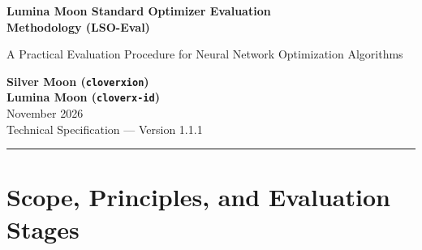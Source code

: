 \documentclass[11pt,a4paper]{article}
\renewcommand{\_}{\origunderscore\allowbreak}
\begin{document}
\thispagestyle{plain}
\begin{center}
    \vspace*{0.6cm}
    {\LARGE\bfseries Lumina Moon Standard Optimizer Evaluation\\[0.25em]
    Methodology (LSO-Eval)\par}
    \vspace{0.35cm}
    {\large A Practical Evaluation Procedure for Neural Network Optimization Algorithms\par}
    \vspace{0.55cm}
    {\normalsize\bfseries Silver Moon (\texttt{cloverxion})}\\[0.2em]
    {\normalsize\bfseries Lumina Moon (\texttt{cloverx-id})}\\[0.55cm]
    {\normalsize November 2026}\\[0.15em]
    {\small Technical Specification --- Version 1.1.1}
    \vspace{0.45cm}
\end{center}

\begin{abstract}
\noindent
This specification defines the \textbf{Lumina Moon Standard Optimizer Evaluation Methodology (LSO-Eval v1.1.1)}, a practical procedure for testing and benchmarking neural network optimizers across CPU and GPU implementations. LSO-Eval divides verification into four sequential stages, moving from fast mathematical checks on CPU to full-scale model training on GPU: (I) Algebraic Safety and Numerical Precision Checks, (II) Synthetic Test Functions, Backend Consistency, and Checkpointing, (III) Short-Run Proxy Model Screening, and (IV) Large-Scale Pre-Training Evaluation with Train--Validation Deduplication and Two-Class Acceptance Criteria. Beyond the core language modeling pipeline, \textbf{V-Eval} tests computer vision architectures across low-, medium-, and full-resolution datasets, and \textbf{D-Eval} guards against regressions between software releases. Both Stage IV and V-Eval define a single-GPU \textit{Standard Setup} alongside a multi-GPU \textit{Extended Setup} so the same benchmark rules scale from local workstations to cluster runs. All rules in Sections 1--7 are algorithm-agnostic.
\end{abstract}

\vspace{0.3cm}
\noindent\rule{\textwidth}{0.4pt}
\vspace{0.2cm}

\section{Scope, Principles, and Evaluation Stages}
\end{document}
